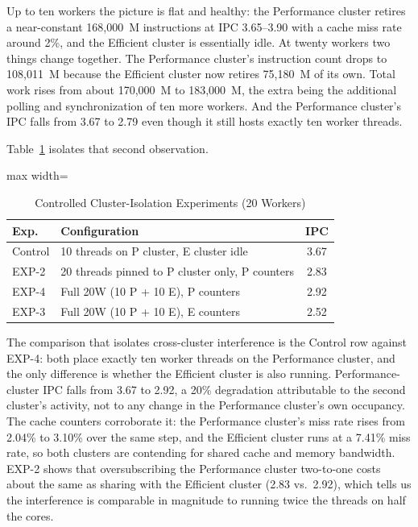 \documentclass[conference]{IEEEtran}
\begin{document}
Up to ten workers the picture is flat and healthy: the Performance cluster retires a near-constant 168,000~M instructions at IPC 3.65--3.90 with a cache miss rate around 2\%, and the Efficient cluster is essentially idle. At twenty workers two things change together. The Performance cluster's instruction count drops to 108,011~M because the Efficient cluster now retires 75,180~M of its own. Total work rises from about 170,000~M to 183,000~M, the extra being the additional polling and synchronization of ten more workers. And the Performance cluster's IPC falls from 3.67 to 2.79 even though it still hosts exactly ten worker threads.

Table~\ref{tab:ipcproof} isolates that second observation.

\begin{table}[htbp]
\caption{Controlled Cluster-Isolation Experiments (20 Workers)}
\begin{center}
\small
\begin{adjustbox}{max width=\columnwidth}
\begin{tabular}{|l|l|c|}
\hline
\textbf{Exp.} & \textbf{Configuration} & \textbf{IPC} \\
\hline
Control & 10 threads on P cluster, E cluster idle & 3.67 \\
EXP-2 & 20 threads pinned to P cluster only, P counters & 2.83 \\
EXP-4 & Full 20W (10 P + 10 E), P counters & 2.92 \\
EXP-3 & Full 20W (10 P + 10 E), E counters & 2.52 \\
\hline
\end{tabular}
\end{adjustbox}
\label{tab:ipcproof}
\end{center}
\end{table}

The comparison that isolates cross-cluster interference is the Control row against EXP-4: both place exactly ten worker threads on the Performance cluster, and the only difference is whether the Efficient cluster is also running. Performance-cluster IPC falls from 3.67 to 2.92, a 20\% degradation attributable to the second cluster's activity, not to any change in the Performance cluster's own occupancy. The cache counters corroborate it: the Performance cluster's miss rate rises from 2.04\% to 3.10\% over the same step, and the Efficient cluster runs at a 7.41\% miss rate, so both clusters are contending for shared cache and memory bandwidth. EXP-2 shows that oversubscribing the Performance cluster two-to-one costs about the same as sharing with the Efficient cluster (2.83 vs.\ 2.92), which tells us the interference is comparable in magnitude to running twice the threads on half the cores.
\end{document}
